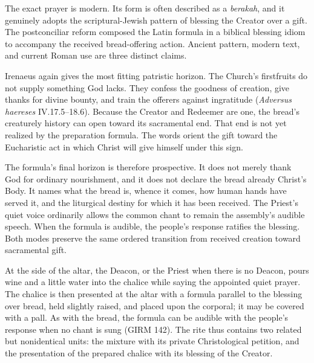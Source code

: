 The exact prayer is modern. Its form is often described as a \emph{berakah}, and it genuinely adopts the scriptural-Jewish pattern of blessing the Creator over a gift. The postconciliar reform composed the Latin formula in a biblical blessing idiom to accompany the received bread-offering action. Ancient pattern, modern text, and current Roman use are three distinct claims.

Irenaeus again gives the most fitting patristic horizon. The Church's firstfruits do not supply something God lacks. They confess the goodness of creation, give thanks for divine bounty, and train the offerers against ingratitude (\emph{Adversus haereses} IV.17.5--18.6). Because the Creator and Redeemer are one, the bread's creaturely history can open toward its sacramental end. That end is not yet realized by the preparation formula. The words orient the gift toward the Eucharistic act in which Christ will give himself under this sign.

The formula's final horizon is therefore prospective. It does not merely thank God for ordinary nourishment, and it does not declare the bread already Christ's Body. It names what the bread is, whence it comes, how human hands have served it, and the liturgical destiny for which it has been received. The Priest's quiet voice ordinarily allows the common chant to remain the assembly's audible speech. When the formula is audible, the people's response ratifies the blessing. Both modes preserve the same ordered transition from received creation toward sacramental gift.


At the side of the altar, the Deacon, or the Priest when there is no Deacon, pours wine and a little water into the chalice while saying the appointed quiet prayer. The chalice is then presented at the altar with a formula parallel to the blessing over bread, held slightly raised, and placed upon the corporal; it may be covered with a pall. As with the bread, the formula can be audible with the people's response when no chant is sung (GIRM 142). The rite thus contains two related but nonidentical units: the mixture with its private Christological petition, and the presentation of the prepared chalice with its blessing of the Creator.

